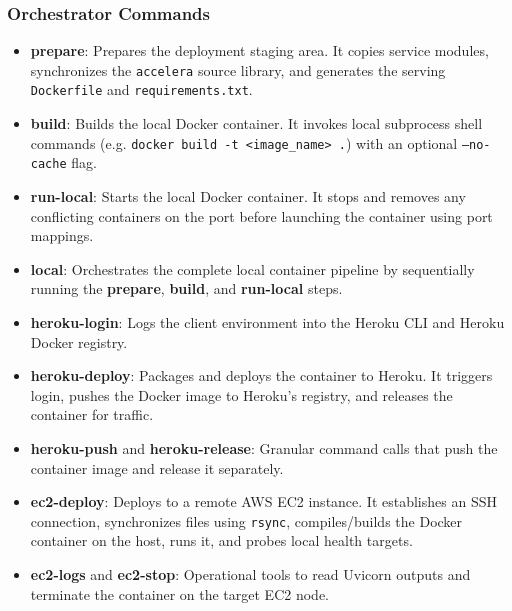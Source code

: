 \documentclass[12pt,a4paper,oneside]{report}
\begin{document}
\subsubsection{Orchestrator Commands}
\begin{itemize}[leftmargin=*]
  \item \textbf{prepare}: Prepares the deployment staging area. It copies service modules, synchronizes the \texttt{accelera} source library, and generates the serving \texttt{Dockerfile} and \texttt{requirements.txt}.
  \item \textbf{build}: Builds the local Docker container. It invokes local subprocess shell commands (e.g. \texttt{docker build -t <image\_name> .}) with an optional \texttt{--no-cache} flag.
  \item \textbf{run-local}: Starts the local Docker container. It stops and removes any conflicting containers on the port before launching the container using port mappings.
  \item \textbf{local}: Orchestrates the complete local container pipeline by sequentially running the \textbf{prepare}, \textbf{build}, and \textbf{run-local} steps.
  \item \textbf{heroku-login}: Logs the client environment into the Heroku CLI and Heroku Docker registry.
  \item \textbf{heroku-deploy}: Packages and deploys the container to Heroku. It triggers login, pushes the Docker image to Heroku's registry, and releases the container for traffic.
  \item \textbf{heroku-push} and \textbf{heroku-release}: Granular command calls that push the container image and release it separately.
  \item \textbf{ec2-deploy}: Deploys to a remote AWS EC2 instance. It establishes an SSH connection, synchronizes files using \texttt{rsync}, compiles/builds the Docker container on the host, runs it, and probes local health targets.
  \item \textbf{ec2-logs} and \textbf{ec2-stop}: Operational tools to read Uvicorn outputs and terminate the container on the target EC2 node.
\end{itemize}
\end{document}
